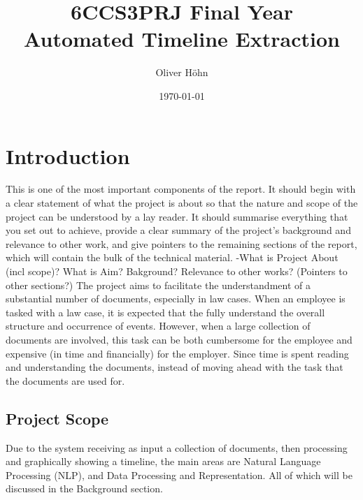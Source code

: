 \documentclass[11pt]{informatics-report}
\title{6CCS3PRJ Final Year\\\vspace{0.2cm}Automated Timeline Extraction}
\author{Oliver H\"ohn}
\date{\today}
\begin{document}
\createFrontMatter
\onehalfspacing
\tableofcontents
\doublespacing


\chapter{Introduction}
This is one of the most important components of the report. It should begin with a clear statement of what the project is about so that the nature and scope of the project can be understood by a lay reader. It should summarise everything that you set out to achieve, provide a clear summary of the project's background and relevance to other work, and give pointers to the remaining sections of the report, which will contain the bulk of the technical material.
-What is Project About (incl scope)? What is Aim? Bakground? Relevance to other works? (Pointers to other sections?)
The project aims to facilitate the understandment of a substantial number of documents, especially in law cases. When an employee is tasked with a law case, it is expected that the fully understand the overall structure and occurrence of events. However, when a large collection of documents are involved, this task can be both cumbersome for the employee and expensive (in time and financially) for the employer. Since time is spent reading and understanding the documents, instead of moving ahead with the task that the documents are used for.
\section{Project Scope}
\par Due to the system receiving as input a collection of documents, then processing and graphically showing a timeline, the main areas are Natural Language Processing (NLP), and Data Processing and Representation. All of which will be discussed in the Background section.
\end{document}
